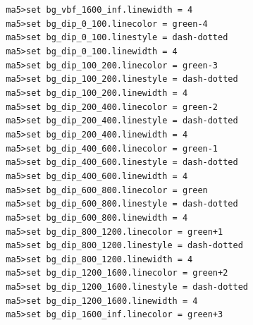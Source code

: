 \documentclass[a4paper, 10pt]{article}
\begin{document}
\texttt{ }\texttt{ }\texttt{ma5>set bg\_vbf\_1600\_inf.linewidth = 4\\
}
\texttt{ }\texttt{ }\texttt{ma5>set bg\_dip\_0\_100.linecolor = green-4\\
}
\texttt{ }\texttt{ }\texttt{ma5>set bg\_dip\_0\_100.linestyle = dash-dotted\\
}
\texttt{ }\texttt{ }\texttt{ma5>set bg\_dip\_0\_100.linewidth = 4\\
}
\texttt{ }\texttt{ }\texttt{ma5>set bg\_dip\_100\_200.linecolor = green-3\\
}
\texttt{ }\texttt{ }\texttt{ma5>set bg\_dip\_100\_200.linestyle = dash-dotted\\
}
\texttt{ }\texttt{ }\texttt{ma5>set bg\_dip\_100\_200.linewidth = 4\\
}
\texttt{ }\texttt{ }\texttt{ma5>set bg\_dip\_200\_400.linecolor = green-2\\
}
\texttt{ }\texttt{ }\texttt{ma5>set bg\_dip\_200\_400.linestyle = dash-dotted\\
}
\texttt{ }\texttt{ }\texttt{ma5>set bg\_dip\_200\_400.linewidth = 4\\
}
\texttt{ }\texttt{ }\texttt{ma5>set bg\_dip\_400\_600.linecolor = green-1\\
}
\texttt{ }\texttt{ }\texttt{ma5>set bg\_dip\_400\_600.linestyle = dash-dotted\\
}
\texttt{ }\texttt{ }\texttt{ma5>set bg\_dip\_400\_600.linewidth = 4\\
}
\texttt{ }\texttt{ }\texttt{ma5>set bg\_dip\_600\_800.linecolor = green\\
}
\texttt{ }\texttt{ }\texttt{ma5>set bg\_dip\_600\_800.linestyle = dash-dotted\\
}
\texttt{ }\texttt{ }\texttt{ma5>set bg\_dip\_600\_800.linewidth = 4\\
}
\texttt{ }\texttt{ }\texttt{ma5>set bg\_dip\_800\_1200.linecolor = green+1\\
}
\texttt{ }\texttt{ }\texttt{ma5>set bg\_dip\_800\_1200.linestyle = dash-dotted\\
}
\texttt{ }\texttt{ }\texttt{ma5>set bg\_dip\_800\_1200.linewidth = 4\\
}
\texttt{ }\texttt{ }\texttt{ma5>set bg\_dip\_1200\_1600.linecolor = green+2\\
}
\texttt{ }\texttt{ }\texttt{ma5>set bg\_dip\_1200\_1600.linestyle = dash-dotted\\
}
\texttt{ }\texttt{ }\texttt{ma5>set bg\_dip\_1200\_1600.linewidth = 4\\
}
\texttt{ }\texttt{ }\texttt{ma5>set bg\_dip\_1600\_inf.linecolor = green+3\\
}
\end{document}
